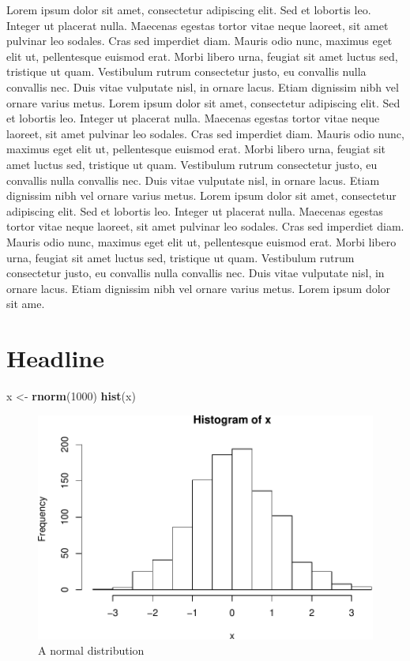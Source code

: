 \documentclass[floatsintext,man]{apa6}
\newenvironment{Shaded}{\begin{snugshade}}{\end{snugshade}}
\newcommand{\DecValTok}[1]{\textcolor[rgb]{0.00,0.00,0.81}{#1}}
\newcommand{\KeywordTok}[1]{\textcolor[rgb]{0.13,0.29,0.53}{\textbf{#1}}}
\newcommand{\NormalTok}[1]{#1}
\newcommand{\StringTok}[1]{\textcolor[rgb]{0.31,0.60,0.02}{#1}}
\theoremstyle{definition}
\theoremstyle{definition}
\theoremstyle{definition}
\theoremstyle{remark}
\begin{document}
Lorem ipsum dolor sit amet, consectetur adipiscing elit. Sed et lobortis
leo. Integer ut placerat nulla. Maecenas egestas tortor vitae neque
laoreet, sit amet pulvinar leo sodales. Cras sed imperdiet diam. Mauris
odio nunc, maximus eget elit ut, pellentesque euismod erat. Morbi libero
urna, feugiat sit amet luctus sed, tristique ut quam. Vestibulum rutrum
consectetur justo, eu convallis nulla convallis nec. Duis vitae
vulputate nisl, in ornare lacus. Etiam dignissim nibh vel ornare varius
metus. Lorem ipsum dolor sit amet, consectetur adipiscing elit. Sed et
lobortis leo. Integer ut placerat nulla. Maecenas egestas tortor vitae
neque laoreet, sit amet pulvinar leo sodales. Cras sed imperdiet diam.
Mauris odio nunc, maximus eget elit ut, pellentesque euismod erat. Morbi
libero urna, feugiat sit amet luctus sed, tristique ut quam. Vestibulum
rutrum consectetur justo, eu convallis nulla convallis nec. Duis vitae
vulputate nisl, in ornare lacus. Etiam dignissim nibh vel ornare varius
metus. Lorem ipsum dolor sit amet, consectetur adipiscing elit. Sed et
lobortis leo. Integer ut placerat nulla. Maecenas egestas tortor vitae
neque laoreet, sit amet pulvinar leo sodales. Cras sed imperdiet diam.
Mauris odio nunc, maximus eget elit ut, pellentesque euismod erat. Morbi
libero urna, feugiat sit amet luctus sed, tristique ut quam. Vestibulum
rutrum consectetur justo, eu convallis nulla convallis nec. Duis vitae
vulputate nisl, in ornare lacus. Etiam dignissim nibh vel ornare varius
metus. Lorem ipsum dolor sit ame.

\hypertarget{headline}{%
\section{Headline}\label{headline}}

\begin{Shaded}
\begin{Highlighting}[]
\NormalTok{x <-}\StringTok{ }\KeywordTok{rnorm}\NormalTok{(}\DecValTok{1000}\NormalTok{)}
\KeywordTok{hist}\NormalTok{(x)}
\end{Highlighting}
\end{Shaded}

\begin{figure}
\centering
\includegraphics{Example_Paper_files/figure-latex/unnamed-chunk-3-1.pdf}
\caption{\label{fig:unnamed-chunk-3}A normal distribution}
\end{figure}
\end{document}
